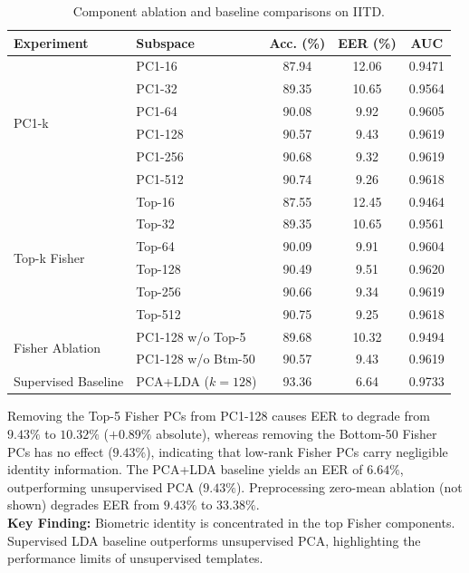 \documentclass[conference]{IEEEtran}
\begin{document}
\begin{table}[h]
\centering
\caption{Component ablation and baseline comparisons on IITD.}
\label{tab:ablation}
\begin{tabular}{@{}llccc@{}}
\toprule
\textbf{Experiment} & \textbf{Subspace} & \textbf{Acc. (\%)} & \textbf{EER (\%)} & \textbf{AUC} \\
\midrule
\multirow{6}{*}{PC1-k} & PC1-16 & 87.94 & 12.06 & 0.9471 \\
                       & PC1-32 & 89.35 & 10.65 & 0.9564 \\
                       & PC1-64 & 90.08 & 9.92 & 0.9605 \\
                       & PC1-128 & 90.57 & 9.43 & 0.9619 \\
                       & PC1-256 & 90.68 & 9.32 & 0.9619 \\
                       & PC1-512 & 90.74 & 9.26 & 0.9618 \\
\midrule
\multirow{6}{*}{Top-k Fisher} & Top-16 & 87.55 & 12.45 & 0.9464 \\
                              & Top-32 & 89.35 & 10.65 & 0.9561 \\
                              & Top-64 & 90.09 & 9.91 & 0.9604 \\
                              & Top-128 & 90.49 & 9.51 & 0.9620 \\
                              & Top-256 & 90.66 & 9.34 & 0.9619 \\
                              & Top-512 & 90.75 & 9.25 & 0.9618 \\
\midrule
\multirow{2}{*}{Fisher Ablation} & PC1-128 w/o Top-5 & 89.68 & 10.32 & 0.9494 \\
                                 & PC1-128 w/o Btm-50 & 90.57 & 9.43 & 0.9619 \\
\midrule
Supervised Baseline & PCA+LDA ($k{=}128$) & 93.36 & 6.64 & 0.9733 \\
\bottomrule
\end{tabular}
\end{table}

Removing the Top-5 Fisher PCs from PC1-128 causes EER to degrade from $9.43\%$ to $10.32\%$ ($+0.89\%$ absolute), whereas removing the Bottom-50 Fisher PCs has no effect ($9.43\%$), indicating that low-rank Fisher PCs carry negligible identity information. The PCA+LDA baseline yields an EER of $6.64\%$, outperforming unsupervised PCA ($9.43\%$). Preprocessing zero-mean ablation (not shown) degrades EER from $9.43\%$ to $33.38\%$.
\\
\textbf{Key Finding:} Biometric identity is concentrated in the top Fisher components. Supervised LDA baseline outperforms unsupervised PCA, highlighting the performance limits of unsupervised templates.
\end{document}

